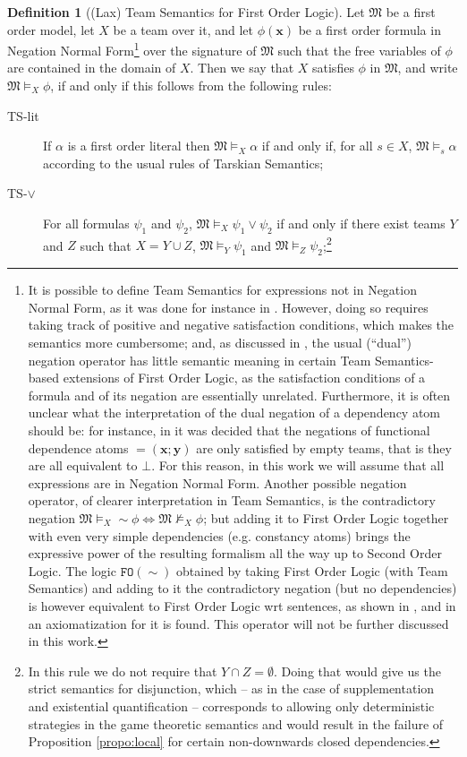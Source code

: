 \documentclass{article}
\theoremstyle{definition}
\newtheorem{Definition}[Theorem]{Definition}
\newcommand{\tuple}{\mathbf}
\newcommand{\FO}{\texttt{FO}}
\newcommand{\M}{\mathfrak M}
\begin{document}
\begin{Definition}[(Lax) Team Semantics for First Order Logic]
Let $\M$ be a first order model, let $X$ be a team over it, and let $\phi(\tuple x)$ be a first order formula in Negation Normal Form\footnote{It is possible to define Team Semantics for expressions not in Negation Normal Form, as it was done for instance in \cite{vaananen07}. However, doing so requires taking track of positive and negative satisfaction conditions, which makes the semantics more cumbersome; and, as discussed in \cite{kontinenv10}, the usual (``dual'') negation operator has little semantic meaning in certain Team Semantics-based extensions of First Order Logic, as the satisfaction conditions of a formula and of its negation are essentially unrelated. Furthermore, it is often unclear what the interpretation of the dual negation of a dependency atom should be: for instance, in \cite{vaananen07} it was decided that the negations of functional dependence atoms $=\!\!(\tuple x; \tuple y)$ are only satisfied by empty teams, that is they are all equivalent to $\bot$.  For this reason, in this work we will assume that all expressions are in Negation Normal Form. Another possible negation operator, of clearer interpretation in Team Semantics, is the contradictory negation $\M \models_X \sim \phi \Leftrightarrow \M \not \models_X \phi$; but adding it to First Order Logic together with even very simple dependencies (e.g. constancy atoms) brings the expressive power of the resulting formalism all the way up to Second Order Logic. The logic $\FO(\sim)$ obtained by taking First Order Logic (with Team Semantics) and adding to it the contradictory negation (but no dependencies) is however equivalent to First Order Logic wrt sentences, as shown in \cite{galliani2016strongly}, and in \cite{luck2018axioms} an axiomatization for it is found. This operator will not be further discussed in this work.} over the signature of $\M$ such that the free variables of $\phi$ are contained in the domain of $X$. Then we say that $X$ satisfies $\phi$ in $\M$, and write $\M \models_X \phi$, if and only if this follows from the following rules: 
\begin{description}
\item[TS-lit] If $\alpha$ is a first order literal then $\M \models_X \alpha$ if and only if, for all $s \in X$, $\M \models_s \alpha$ according to the usual rules of Tarskian Semantics; 
\item[TS-$\vee$] For all formulas $\psi_1$ and $\psi_2$, $\M \models_X \psi_1 \vee \psi_2$ if and only if there exist teams $Y$ and $Z$ such that $X = Y \cup Z$, $\M \models_{Y} \psi_1$ and $\M \models_{Z} \psi_2$;\footnote{In this rule we do not require that $Y \cap Z = \emptyset$. Doing that would give us the strict semantics for disjunction, which -- as in the case of supplementation and existential quantification --  corresponds to allowing only deterministic strategies in the game theoretic semantics and would result in the failure of Proposition \ref{propo:local} for certain non-downwards closed dependencies.}

\end{description}
\end{Definition}
\end{document}
